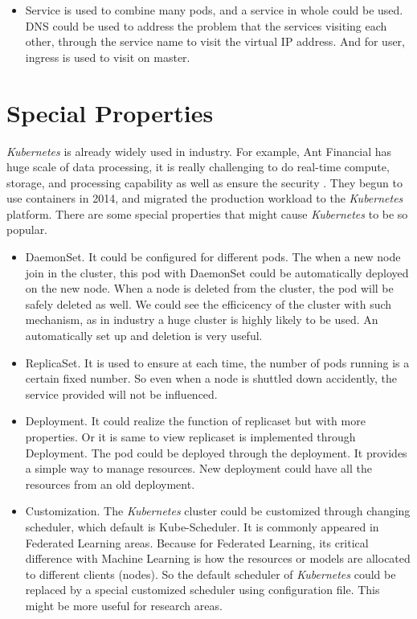 \documentclass[conference, a4paper]{IEEEtran_ID}
\begin{document}
\begin{itemize}
    \item Service is used to combine many pods, and a service in whole could be used. DNS could be used to address the problem that the services visiting each other, through the service name to visit the virtual IP address. And for user, ingress is used to visit on master.
    
\end{itemize}
\section{Special Properties}
\textit{Kubernetes} is already widely used in industry. For example, Ant Financial has huge scale of data processing, it is really  challenging to do real-time compute, storage, and processing capability as well as ensure the security \cite{ant}. They begun to use containers in 2014, and migrated the production workload to the \textit{Kubernetes} platform. There are some special properties that might cause \textit{Kubernetes} to be so popular. 
\begin{itemize}
    \item DaemonSet. It could be configured for different pods. The when a new node join in the cluster, this pod with DaemonSet could be automatically deployed on the new node. When a node is deleted from the cluster, the pod will be safely deleted as well\cite{kudeamon}. We could see the efficicency of the cluster with such mechanism, as in industry a huge cluster is highly likely to be used. An automatically set up and deletion is very useful.
    \item ReplicaSet. It is used to ensure at each time, the number of pods running is a certain fixed number. So even when a node is shuttled down accidently, the service provided will not be influenced. 
    \item Deployment. It could realize the function of replicaset but with more properties. Or it is same to view replicaset is implemented through Deployment. The pod could be deployed through the deployment. It provides a simple way to manage resources. New deployment could have all the resources from an old deployment. 
    \item Customization. The \textit{Kubernetes} cluster could be customized through changing scheduler, which default is Kube-Scheduler. It is commonly appeared in Federated Learning areas. Because for Federated Learning, its critical difference with Machine Learning is how the resources or models are allocated to different clients  (nodes). So the default scheduler of \textit{Kubernetes} could be replaced by a special customized scheduler using configuration file\cite{8486422}. This might be more useful for research areas.
\end{itemize}
\end{document}
